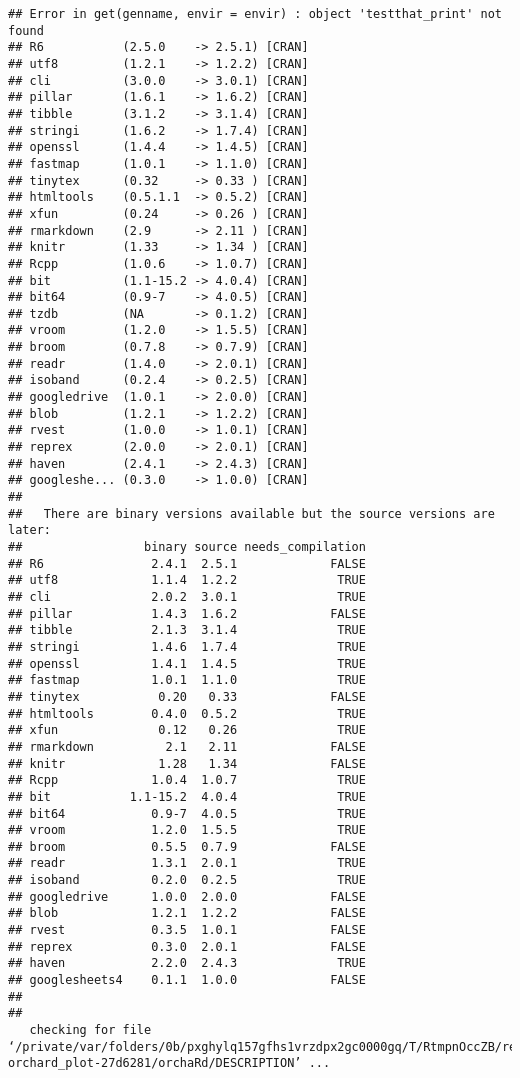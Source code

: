 \documentclass[]{article}
\begin{document}
\begin{verbatim}
## Error in get(genname, envir = envir) : object 'testthat_print' not found
## R6           (2.5.0    -> 2.5.1) [CRAN]
## utf8         (1.2.1    -> 1.2.2) [CRAN]
## cli          (3.0.0    -> 3.0.1) [CRAN]
## pillar       (1.6.1    -> 1.6.2) [CRAN]
## tibble       (3.1.2    -> 3.1.4) [CRAN]
## stringi      (1.6.2    -> 1.7.4) [CRAN]
## openssl      (1.4.4    -> 1.4.5) [CRAN]
## fastmap      (1.0.1    -> 1.1.0) [CRAN]
## tinytex      (0.32     -> 0.33 ) [CRAN]
## htmltools    (0.5.1.1  -> 0.5.2) [CRAN]
## xfun         (0.24     -> 0.26 ) [CRAN]
## rmarkdown    (2.9      -> 2.11 ) [CRAN]
## knitr        (1.33     -> 1.34 ) [CRAN]
## Rcpp         (1.0.6    -> 1.0.7) [CRAN]
## bit          (1.1-15.2 -> 4.0.4) [CRAN]
## bit64        (0.9-7    -> 4.0.5) [CRAN]
## tzdb         (NA       -> 0.1.2) [CRAN]
## vroom        (1.2.0    -> 1.5.5) [CRAN]
## broom        (0.7.8    -> 0.7.9) [CRAN]
## readr        (1.4.0    -> 2.0.1) [CRAN]
## isoband      (0.2.4    -> 0.2.5) [CRAN]
## googledrive  (1.0.1    -> 2.0.0) [CRAN]
## blob         (1.2.1    -> 1.2.2) [CRAN]
## rvest        (1.0.0    -> 1.0.1) [CRAN]
## reprex       (2.0.0    -> 2.0.1) [CRAN]
## haven        (2.4.1    -> 2.4.3) [CRAN]
## googleshe... (0.3.0    -> 1.0.0) [CRAN]
## 
##   There are binary versions available but the source versions are later:
##                 binary source needs_compilation
## R6               2.4.1  2.5.1             FALSE
## utf8             1.1.4  1.2.2              TRUE
## cli              2.0.2  3.0.1              TRUE
## pillar           1.4.3  1.6.2             FALSE
## tibble           2.1.3  3.1.4              TRUE
## stringi          1.4.6  1.7.4              TRUE
## openssl          1.4.1  1.4.5              TRUE
## fastmap          1.0.1  1.1.0              TRUE
## tinytex           0.20   0.33             FALSE
## htmltools        0.4.0  0.5.2              TRUE
## xfun              0.12   0.26              TRUE
## rmarkdown          2.1   2.11             FALSE
## knitr             1.28   1.34             FALSE
## Rcpp             1.0.4  1.0.7              TRUE
## bit           1.1-15.2  4.0.4              TRUE
## bit64            0.9-7  4.0.5              TRUE
## vroom            1.2.0  1.5.5              TRUE
## broom            0.5.5  0.7.9             FALSE
## readr            1.3.1  2.0.1              TRUE
## isoband          0.2.0  0.2.5              TRUE
## googledrive      1.0.0  2.0.0             FALSE
## blob             1.2.1  1.2.2             FALSE
## rvest            0.3.5  1.0.1             FALSE
## reprex           0.3.0  2.0.1             FALSE
## haven            2.2.0  2.4.3              TRUE
## googlesheets4    0.1.1  1.0.0             FALSE
## 
##   
   checking for file ‘/private/var/folders/0b/pxghylq157gfhs1vrzdpx2gc0000gq/T/RtmpnOccZB/remotes31ac7b962c89/itchyshin-orchard_plot-27d6281/orchaRd/DESCRIPTION’ ...
  

\end{verbatim}
\end{document}
